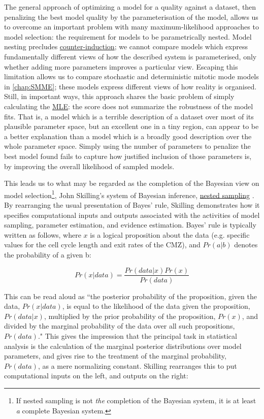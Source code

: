 The general approach of optimizing a model for a quality against a dataset, then penalizing the best model quality by the parameterisation of the model, allows us to overcome an important problem with many maximum-likelihood approaches to model selection: the requirement for models to be parametrically nested. Model nesting precludes \hyperref[sec:Feyerabend]{counter-induction}; we cannot compare models which express fundamentally different views of how the described system is parameterised, only whether adding more parameters improves a particular view. Escaping this limitation allows us to compare stochastic and deterministic mitotic mode models in \autoref{chap:SMME}; these models express different views of how reality is organised. Still, in important ways, this approach shares the basic problem of simply calculating the \hyperref[ssec:MLE]{MLE}: the score does not summarize the robustness of the model fits. That is, a model which is a terrible description of a dataset over most of its plausible parameter space, but an excellent one in a tiny region, can appear to be a better explanation than a model which is a broadly good description over the whole parameter space. Simply using the number of parameters to penalize the best model found fails to capture how justified inclusion of those parameters is, by improving the overall likelihood of sampled models.

This leads us to what may be regarded as the completion of the Bayesian view on model selection\footnote{If nested sampling is not \textit{the} completion of the Bayesian system, it is at least \textit{a} complete Bayesian system.}, John Skilling's system of Bayesian inference, \hyperref[ssec:nested]{nested sampling} \cite{Skilling2006,Skilling2012,Skilling2019}. By rearranging the usual presentation of Bayes' rule, Skilling demonstrates how it specifies computational inputs and outputs associated with the activities of model sampling, parameter estimation, and evidence estimation. Bayes' rule is typically written as follows, where $x$ is a logical proposition about the data (e.g. specific values for the cell cycle length and exit rates of the CMZ), and $Pr(a|b)$ denotes the probability of a given b:

\[Pr(x|data) = \frac{Pr(data|x)Pr(x)}{Pr(data)}\]

This can be read aloud as ``the posterior probability of the proposition, given the data, $Pr(x|data)$, is equal to the likelihood of the data given the proposition, $Pr(data|x)$, multiplied by the prior probability of the proposition, $Pr(x)$, and divided by the marginal probability of the data over all such propositions, $Pr(data)$." This gives the impression that the principal task in statistical analysis is the calculation of the marginal posterior distributions over model parameters, and gives rise to the treatment of the marginal probability, $Pr(data)$, as a mere normalizing constant. Skilling rearranges this to put computational inputs on the left, and outputs on the right:

